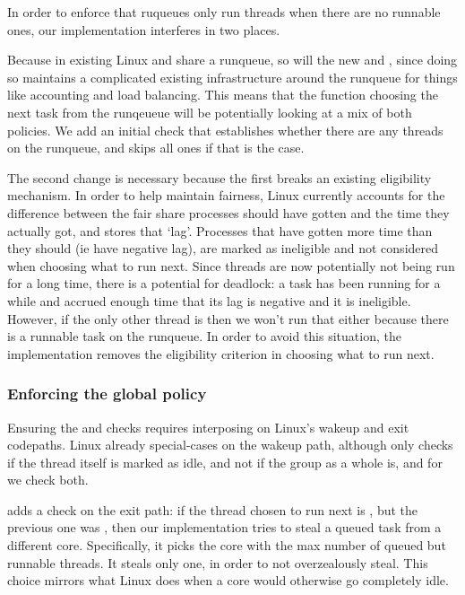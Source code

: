 In order to enforce that ruqueues only run \schedbe{} threads when there are no
runnable \schednormal{} ones, our implementation interferes in two places. 

Because in existing Linux \schedidle{} and \schednormal{} share a runqueue, so
will the new \schedbe{} and \schednormal{}, since doing so maintains a
complicated existing infrastructure around the runqueue for things like
accounting and load balancing. This means that the function choosing the next
task from the runqeueue will be potentially looking at a mix of both policies.
We add an initial check that establishes whether there are any \schednormal{}
threads on the runqueue, and skips all \schedbe{} ones if that is the case. 

The second change is necessary because the first breaks an existing eligibility
mechanism. In order to help maintain fairness, Linux currently accounts for the
difference between the fair share processes should have gotten and the time they
actually got, and stores that `lag'. Processes that have gotten more time than
they should (ie have negative lag), are marked as ineligible and not considered
when choosing what to run next. Since \schedbe{} threads are now potentially not
being run for a long time, there is a potential for deadlock: a \schednormal{}
task has been running for a while and accrued enough time that its lag is
negative and it is ineligible. However, if the only other thread is \schedbe{}
then we won't run that either because there is a runnable \schednormal{} task on
the runqueue. In order to avoid this situation, the implementation removes the
eligibility criterion in choosing what to run next.


\subsubsection{Enforcing the global policy}\label{ss:implementation:exit}

Ensuring the \entry{} and \exit{} checks requires interposing on Linux's wakeup
and exit codepaths. Linux already special-cases on the wakeup path, although
only checks if the thread itself is marked as idle, and not if the group as a
whole is, and for \schedbe{} we check both.

\schedbe{} adds a check on the exit path: if the thread chosen to run next is
\schedbe{}, but the previous one was \schednormal{}, then our implementation
tries to steal a queued \schednormal{} task from a different core. Specifically,
it picks the core with the max number of queued but runnable \schednormal{}
threads. It steals only one, in order to not overzealously steal. This choice
mirrors what Linux does when a core would otherwise go completely idle.